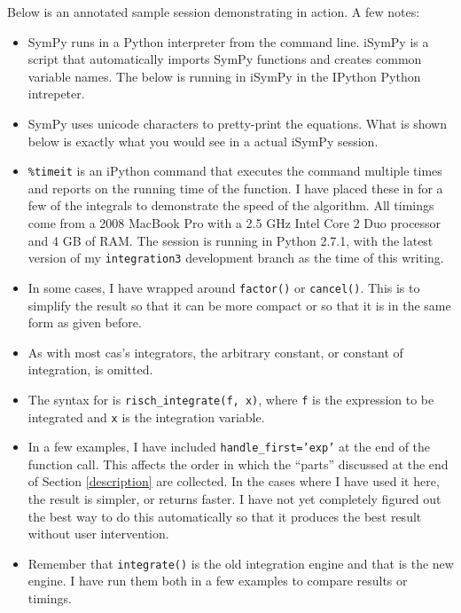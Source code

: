 Below is an annotated sample session demonstrating \rischintegrate{} in action.  A few notes:
\begin{itemize}
\item SymPy runs in a Python interpreter from the command line. iSymPy is
a script that automatically imports SymPy functions and creates common
variable names.  The below is running in iSymPy in the IPython
Python intrepeter.

\item SymPy uses unicode characters to pretty-print the equations. 
What is shown below is exactly what you would see in a actual iSymPy
session.

\item \texttt{\%timeit} is an iPython command that executes the command
multiple times and reports on the running time of the function. I have
placed these in for a few of the integrals to demonstrate the speed of
the algorithm.  All timings come from a 2008 MacBook Pro with a 2.5 GHz
Intel Core 2 Duo processor and 4 GB of RAM.  The session is running in
Python 2.7.1, with the latest version of my \texttt{integration3}
development branch as the time of this writing.  

\item In some cases, I have wrapped \rischintegrate{} around
\texttt{factor()} or \texttt{cancel()}.  This is to simplify the result
so that it can be more compact or so that it is in the same form as
given before.

\item As with most \gls{cas}'s integrators, the arbitrary constant, or
constant of integration, is omitted.  

\item The syntax for \rischintegrate{} is \texttt{risch\_integrate(f, x)},
where \texttt{f} is the expression to be integrated and \texttt{x} is
the integration variable.

\item In a few examples, I have included \texttt{handle\_first='exp'} at
the end of the \rischintegrate{} function call.  This affects the order in
which the ``parts'' discussed at the end of Section \ref{description}
are collected.  In the cases where I have used it here, the result is
simpler, or returns faster.  I have not yet completely figured out the
best way to do this automatically so that it produces the best result
without user intervention.  

\item Remember that \texttt{integrate()} is the old \gls{integration}
engine and that \rischintegrate{} is the new engine.  I have run them both in a
few examples to compare results or timings.  


\end{itemize}

